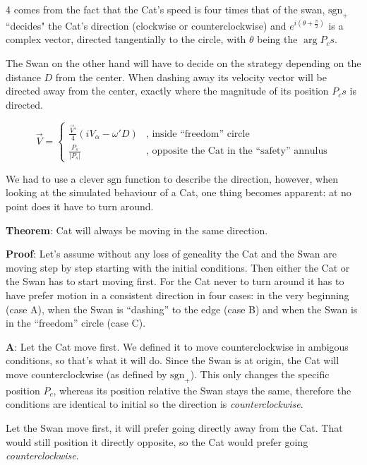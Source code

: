 \documentclass[12pt]{article}
\begin{document}
4 comes from the fact that the Cat's speed is four times that of the swan, $\text{sgn}_+$ ``decides" the Cat's direction (clockwise or counterclockwise) and $e^{i (\theta + \frac{\pi}{2})}$ is a complex vector, directed tangentially to the circle, with $\theta$ being the $\arg P_cs$. 

The Swan on the other hand will have to decide on the strategy depending on the distance $D$ from the center. When dashing away its velocity vector will be directed away from the center, exactly where the magnitude of its position $P_cs$ is directed.

\begin{equation*}
	\vec{V} = \left\{ 
		\begin{aligned}
			\frac{\vec{V}'}{4} (i V_\alpha  - \omega' D) & \text{,   inside ``freedom'' circle} \\
			\frac{P_s}{|P_s|} & \text{,   opposite the Cat in the ``safety'' annulus}
		\end{aligned}
	\right.
\end{equation*}

We had to use a clever $\text{sgn}$ function to describe the direction, however, when looking at the simulated behaviour of a Cat, one thing becomes apparent: at no point does it have to turn around.

\textbf{Theorem}: Cat will always be moving in the same direction.

\textbf{Proof}: Let's assume without any loss of geneality the Cat and the Swan are moving step by step starting with the initial conditions. Then either the Cat or the Swan has to start moving first. 
For the Cat never to turn around it has to have prefer motion in a consistent direction in four cases: in the very beginning (case A), when the Swan is ``dashing'' to the edge (case B) and when the Swan is in the ``freedom'' circle (case C).

\textbf{A}: Let the Cat move first. We defined it to move counterclockwise in ambigous conditions, so that's what it will do. Since the Swan is at origin, the Cat will move counterclockwise (as defined by $\text{sgn}_+$). This only changes the specific position $P_c$, whereas its position relative the Swan stays the same, therefore the conditions are identical to initial so the direction is \textit{counterclockwise}.

Let the Swan move first, it will prefer going directly away from the Cat. That would still position it directly opposite, so the Cat would prefer going \textit{counterclockwise}.
\end{document}
